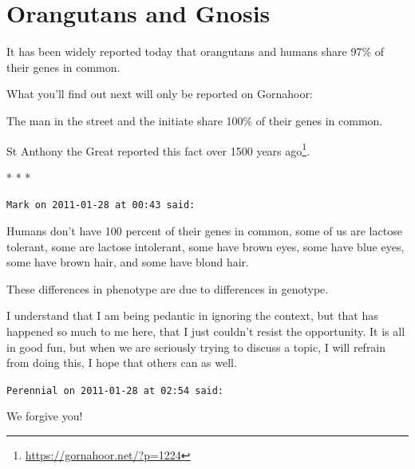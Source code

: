 \section{Orangutans and Gnosis}

It has been widely reported today that orangutans and humans share 97\% of their genes in common.

What you'll find out next will only be reported on Gornahoor:

The man in the street and the initiate share 100\% of their genes in common.

St Anthony the Great reported this fact over 1500 years ago\footnote{\url{https://gornahoor.net/?p=1224}}.



\begin{center}* * *\end{center}

\begin{footnotesize}
\begin{sffamily}
\texttt{Mark on 2011-01-28 at 00:43 said:}

Humans don't have 100 percent of their genes in common, some of us are lactose tolerant, some are lactose intolerant, some have brown eyes, some have blue eyes, some have brown hair, and some have blond hair.

These differences in phenotype are due to differences in genotype.

I understand that I am being pedantic in ignoring the context, but that has happened so much to me here, that I just couldn't resist the opportunity. It is all in good fun, but when we are seriously trying to discuss a topic, I will refrain from doing this, I hope that others can as well.

\hfill

\texttt{Perennial on 2011-01-28 at 02:54 said:}

We forgive you!


\hfill

\end{sffamily}
\end{footnotesize}

